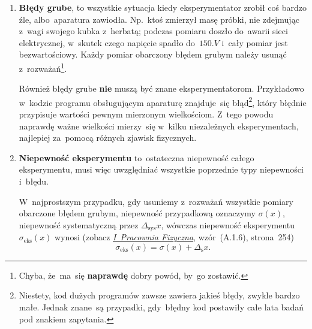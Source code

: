 \documentclass[a4paper,11pt]{article}
\newcommand{\tb}{\textbf}
\begin{document}
\begin{enumerate}
  Innym, zadziwiająco często pojawiającym~się błędem systematycznym,
  jest ten wynikający z~paralaksy. Osoba wykonująca pomiar patrzy~się
  pod kątem na~aparaturę pomiarową, przez co~systematycznie źle
  odczytuje wyniki\footnote{Zapewne błąd ten wynika z~pragnienia
    pewnych ciał do~pozostania w~spoczynku.}

  O~ile opisany powyżej rodzaj błędów systematycznych jest łatwy
  do~zauważenia i~oszacowania, istnieją inne, znacznie trudniejsze
  do~wykrycia i~oszacowanie, przez co~są~dużo groźniejsze. Może~się
  zdarzyć że~efekt fizyczny, na~którym opieramy pomiar, lub~teoria
  na~podstawie której łączymy bezpośrednio zmierzone wielkości
  fizyczne z~poszukiwaną wielkością powoduje np.~systematyczne
  zawyżanie wyników.

  Należy podkreślić, że~błędy systematyczne \tb{nie} muszą być znane
  eksperymentatorom, co jest dużym wyzwaniem przy przeprowadzaniu
  doświadczeń. Przykładowo, w~badanym procesie fizycznym występuje
  zjawisko, które nie zostało wzięte pod uwagę podczas projektowania
  eksperymentu.

\item \textbf{Błędy grube}, to wszystkie sytuacja kiedy
  eksperymentator zrobił coś bardzo źle, albo~aparatura zawiodła.
  Np.~ktoś zmierzył masę próbki, nie zdejmując z~wagi swojego kubka
  z~herbatą; podczas pomiaru doszło do~awarii sieci elektrycznej,
  w~skutek czego napięcie spadło do~$150 \si{.V}$ i~cały pomiar jest
  bezwartościowy. Każdy pomiar obarczony błędem grubym należy usunąć
  z~rozważań\footnote{Chyba, że~ma~się \tb{naprawdę} dobry powód,
    by~go zostawić.}.

  Również błędy grube \textbf{nie} muszą być znane eksperymentatorom.
  Przykładowo w~kodzie programu obsługującym aparaturę znajduje~się
  błąd\footnote{Niestety, kod dużych programów zawsze zawiera jakieś
    błędy, zwykle bardzo małe. Jednak znane~są przypadki, gdy~błędny
    kod postawiły całe lata badań pod znakiem zapytania.}, który
  błędnie przypisuje wartości pewnym mierzonym wielkościom. Z~tego
  powodu naprawdę ważne wielkości mierzy~się w~kilku niezależnych
  eksperymentach, najlepiej za~pomocą różnych zjawisk fizycznych.

\item \textbf{Niepewność eksperymentu} to~ostateczna niepewność całego
  eksperymentu, musi więc uwzględniać wszystkie poprzednie typy
  niepewności i~błędu.

  W~najprostszym przypadku, gdy usuniemy z~rozważań wszystkie pomiary
  obarczone błędem grubym, niepewność przypadkową oznaczymy
  $\sigma( x )$, niepewność systematyczną przez
  $\Delta_{ \textrm{sys} } x$, wówczas niepewność eksperymentu
  $\sigma_{ \textrm{eks} }( x )$ wynosi (zobacz
  \href{http://www.1pf.if.uj.edu.pl/documents/5046939/5227638/skrypt.pdf}{\emph{I~Pracownia
      Fizyczna}}, wzór~(A.1.6), strona~254)
  \begin{equation}
    \label{eq:1}
    \sigma_{ \textrm{eks} }( x ) = \sigma( x ) + \Delta_{ \textrm{s} } x.
  \end{equation}


\end{enumerate}
\end{document}

